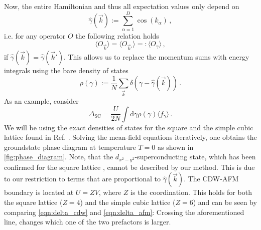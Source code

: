 \documentclass[
    reprint, 
    aps,
    preprintnumbers,
    twocolumn,
    prb,
    superscriptaddress
]{revtex4-2}
\newcommand{\vk}{\vec{k}}
\begin{document}
Now, the entire Hamiltonian and thus all expectation values only depend on
\begin{equation}
    \hat{\gamma}(\vk) := \sum_{\alpha=1}^D \cos(k_\alpha)\,,
\end{equation}
i.e. for any operator $O$ the following relation holds 
\begin{equation}
    \label{eqn:equal_expecs}
    \langle O_{\vk} \rangle = \langle O_{\vk'} \rangle =: \langle O_{\gamma} \rangle\,,
\end{equation}
if $\hat{\gamma}(\vk) = \hat{\gamma}(\vk')$.
This allows us to replace the momentum sums with energy integrals using the bare density of states
\begin{equation}
    \rho(\gamma) := \frac{1}{N} \sum_{\vk} \delta \left(\gamma - \hat{\gamma} (\vk) \right)\,.
\end{equation}
As an example, consider 
\begin{equation}
    \Delta_\text{SC} = \frac{U}{2N} \int \mathrm{d}\gamma \rho(\gamma) \langle f_{\gamma} \rangle\,.
\end{equation}
We will be using the exact densities of states for the square and the simple cubic lattice found in Ref. \cite{Hanisch97}.
Solving the mean-field equations iteratively, one obtains the groundstate phase diagram at temperature $T=0$ as shown in \autoref{fig:phase_diagram}.
Note, that the $d_{x^2 - y^2}$-superconducting state, which has been confirmed for the square lattice \cite{Micnas88b,Huang13}, cannot be described by our method. 
This is due to our restriction to terms that are proportional to $\hat{\gamma}(\vk)$.
\newline
The CDW-AFM boundary is located at $U = ZV$, where $Z$ is the coordination.
This holds for both the square lattice ($Z=4$) and the simple cubic lattice ($Z=6$) and can be seen by comparing \eqref{eqn:delta_cdw} and \eqref{eqn:delta_afm}:
Crossing the aforementioned line, changes which one of the two prefactors is larger.


\end{document}
